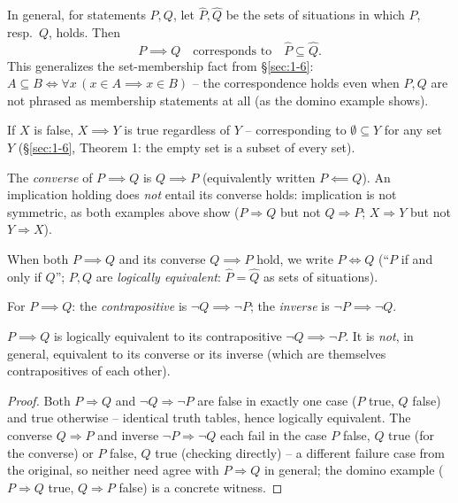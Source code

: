 \begin{note}
In general, for statements $P,Q$, let $\hat P, \hat Q$ be the sets of situations in which $P$, resp.\ $Q$, holds. Then
\[
P \implies Q \quad \text{corresponds to} \quad \hat P \subseteq \hat Q.
\]
This generalizes the set-membership fact from \S\ref{sec:1-6}: $A \subseteq B \iff \forall x\,(x\in A \implies x \in B)$ -- the correspondence holds even when $P,Q$ are not phrased as membership statements at all (as the domino example shows).
\end{note}

\begin{note}
If $X$ is false, $X \implies Y$ is true regardless of $Y$ -- corresponding to $\emptyset \subseteq Y$ for any set $Y$ (\S\ref{sec:1-6}, Theorem 1: the empty set is a subset of every set).
\end{note}

\begin{definition}[Converse]
The \emph{converse} of $P \implies Q$ is $Q \implies P$ (equivalently written $P \impliedby Q$). An implication holding does \emph{not} entail its converse holds: implication is not symmetric, as both examples above show ($P\Rightarrow Q$ but not $Q \Rightarrow P$; $X \Rightarrow Y$ but not $Y \Rightarrow X$).
\end{definition}

\begin{definition}[Biconditional]
When both $P \implies Q$ and its converse $Q \implies P$ hold, we write $P \iff Q$ (``$P$ if and only if $Q$''; $P,Q$ are \emph{logically equivalent}: $\hat P = \hat Q$ as sets of situations).
\end{definition}

\begin{definition}
For $P \implies Q$: the \emph{contrapositive} is $\neg Q \implies \neg P$; the \emph{inverse} is $\neg P \implies \neg Q$.
\end{definition}

\begin{theorem}
$P \implies Q$ is logically equivalent to its contrapositive $\neg Q \implies \neg P$. It is \emph{not}, in general, equivalent to its converse or its inverse (which are themselves contrapositives of each other).
\end{theorem}
\begin{proof}
Both $P\Rightarrow Q$ and $\neg Q \Rightarrow \neg P$ are false in exactly one case ($P$ true, $Q$ false) and true otherwise -- identical truth tables, hence logically equivalent. The converse $Q\Rightarrow P$ and inverse $\neg P \Rightarrow \neg Q$ each fail in the case $P$ false, $Q$ true (for the converse) or $P$ false, $Q$ true (checking directly) -- a different failure case from the original, so neither need agree with $P \Rightarrow Q$ in general; the domino example ($P\Rightarrow Q$ true, $Q \Rightarrow P$ false) is a concrete witness.
\end{proof}

